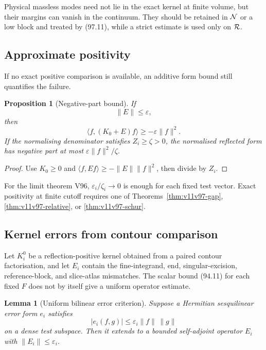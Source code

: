 \documentclass[11pt]{article}
\newtheorem{lemma}[theorem]{Lemma}
\newtheorem{proposition}[theorem]{Proposition}
\begin{document}
Physical massless modes need not lie in the exact kernel at finite
volume, but their margins can vanish in the continuum.  They should
be retained in \({\cal N}\) or a low block and treated by (97.11),
while a strict estimate is used only on \({\cal R}\).

\subsection{Approximate positivity}

If no exact positive comparison is available, an additive form bound
still quantifies the failure.

\begin{proposition}[Negative-part bound]
\label{prop:v11v97-negative}
If
\[
                              \|E\|\le\varepsilon,            \tag{97.12}
\]
then
\[
                    \langle f,(K_0+E)f\rangle
                              \ge-\varepsilon\|f\|^2.        \tag{97.13}
\]
If the normalising denominator satisfies \(Z_i\ge\zeta>0\), the
normalised reflected form has negative part at most
\(\varepsilon\|f\|^2/\zeta\).
\end{proposition}

\begin{proof}
Use \(K_0\ge0\) and
\(\langle f,Ef\rangle\ge-\|E\|\|f\|^2\), then divide by \(Z_i\).
\end{proof}

For the limit theorem V96, \(\varepsilon_i/\zeta_i\to0\) is enough for
each fixed test vector.  Exact positivity at finite cutoff requires
one of Theorems~\ref{thm:v11v97-gap},
\ref{thm:v11v97-relative}, or
\ref{thm:v11v97-schur}.

\subsection{Kernel errors from contour comparison}

Let \(K_i^0\) be a reflection-positive kernel obtained from a paired
contour factorisation, and let \(E_i\) contain the fine-integrand,
end, singular-excision, reference-block, and slice-atlas mismatches.
The scalar bound (94.11) for each fixed \(F\) does not by itself give
a uniform operator estimate.

\begin{lemma}[Uniform bilinear error criterion]
\label{lem:v11v97-bilinear}
Suppose a Hermitian sesquilinear error form \(e_i\) satisfies
\[
                         |e_i(f,g)|
                         \le\varepsilon_i\|f\|\,\|g\|        \tag{97.14}
\]
on a dense test subspace.  Then it extends to a bounded self-adjoint
operator \(E_i\) with \(\|E_i\|\le\varepsilon_i\).
\end{lemma}
\end{document}
